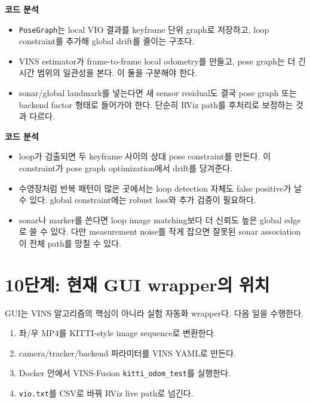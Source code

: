 \documentclass[11pt,a4paper]{article}
\newcommand{\code}[1]{\texttt{#1}}
\newcommand{\codeheading}[1]{\par\vspace{6pt}\noindent{\footnotesize\bfseries\textcolor{codeemph}{#1}}\par\vspace{2pt}}
\newcommand{\readpoint}[1]{\par\noindent{\footnotesize\textcolor{muted}{읽는 포인트: #1}}\par\vspace{2pt}}
\newenvironment{codeanalysis}{%
  \par\vspace{2pt}\noindent
  {\footnotesize\bfseries\textcolor{accentblue}{코드 분석}}\par
  \begin{itemize}[leftmargin=1.35em,topsep=2pt,itemsep=1pt,parsep=0pt]
  \footnotesize
}{%
  \end{itemize}
  \vspace{6pt}
}
\begin{document}
\readpoint{VIO local path를 global pose graph로 보정하는 API 경계다. sonar/global factor도 같은 관점에서 추가한다.}
\codeheading{pose\_graph.h:46--75}

\begin{codeanalysis}
  \item \code{PoseGraph}는 local VIO 결과를 keyframe 단위 graph로 저장하고, loop constraint를 추가해 global drift를 줄이는 구조다.
  \item VINS estimator가 frame-to-frame local odometry를 만들고, pose graph는 더 긴 시간 범위의 일관성을 본다. 이 둘을 구분해야 한다.
  \item sonar/global landmark를 넣는다면 새 sensor residual도 결국 pose graph 또는 backend factor 형태로 들어가야 한다. 단순히 RViz path를 후처리로 보정하는 것과 다르다.
\end{codeanalysis}

\codeheading{keyframe.cpp:483--501}

\begin{codeanalysis}
  \item loop가 검출되면 두 keyframe 사이의 상대 pose constraint를 만든다. 이 constraint가 pose graph optimization에서 drift를 당겨준다.
  \item 수영장처럼 반복 패턴이 많은 곳에서는 loop detection 자체도 false positive가 날 수 있다. global constraint에는 robust loss와 추가 검증이 필요하다.
  \item sonar나 marker를 쓴다면 loop image matching보다 더 신뢰도 높은 global edge로 쓸 수 있다. 다만 measurement noise를 작게 잡으면 잘못된 sonar association이 전체 path를 망칠 수 있다.
\end{codeanalysis}

\section{10단계: 현재 GUI wrapper의 위치}

GUI는 VINS 알고리즘의 핵심이 아니라 실험 자동화 wrapper다.
다음 일을 수행한다.

\begin{enumerate}
  \item 좌/우 MP4를 KITTI-style image sequence로 변환한다.
  \item camera/tracker/backend 파라미터를 VINS YAML로 만든다.
  \item Docker 안에서 VINS-Fusion \code{kitti\_odom\_test}를 실행한다.
  \item \code{vio.txt}를 CSV로 바꿔 RViz live path로 넘긴다.
\end{enumerate}
\end{document}
